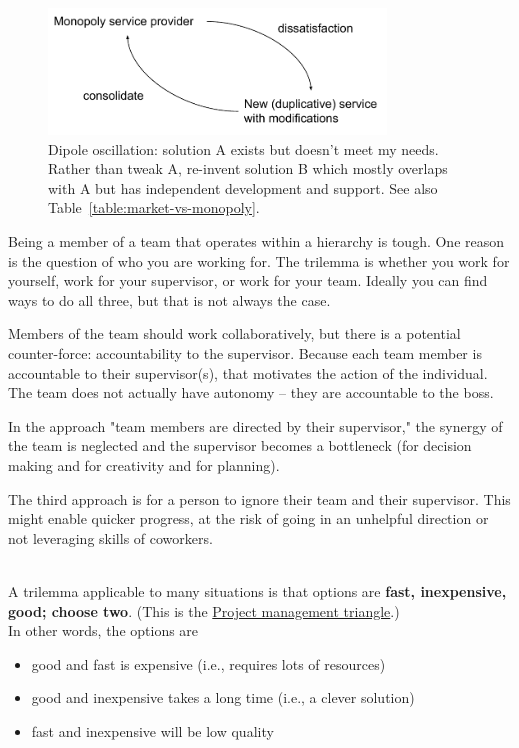 \begin{figure}[ht]
    \centering
    \includegraphics[width=0.8\textwidth]{images/dilemma_market_vs_monopoly.pdf}
    \caption{Dipole oscillation: solution A exists but doesn't meet my needs. Rather than tweak A, re-invent solution B which mostly overlaps with A but has independent development and support. See also Table~\ref{table:market-vs-monopoly}.}
    \label{fig:market-vs-monopoly}
\end{figure}

Being a member of a team that operates within a hierarchy is tough. One reason is the question of who you are working for. The trilemma is whether you work for yourself, work for your supervisor, or work for your team.  Ideally you can find ways to do all three, but that is not always the case. 

Members of the team should work collaboratively, but there is a potential counter-force: accountability to the supervisor. Because each team member is accountable to their supervisor(s), that motivates the action of the individual. The team does not actually have autonomy -- they are accountable to the boss.

In the approach "team members are directed by their supervisor," the synergy of the team is neglected and the supervisor becomes a bottleneck (for decision making and for creativity and for planning).

The third approach is for a person to ignore their team and their supervisor. This might enable quicker progress, at the risk of going in an unhelpful direction or not leveraging skills of coworkers. 

\ \\

A trilemma applicable to many situations is that options are \textbf{fast, inexpensive, good; choose two}. (This is the \href{https://en.wikipedia.org/wiki/Project_management_triangle}{Project management triangle}.) \\
In other words, the options are
\begin{itemize}
    \item good and fast is expensive (i.e., requires lots of resources)
    \item good and inexpensive takes a long time (i.e., a clever solution)
    \item fast and inexpensive will be low quality
\end{itemize}


